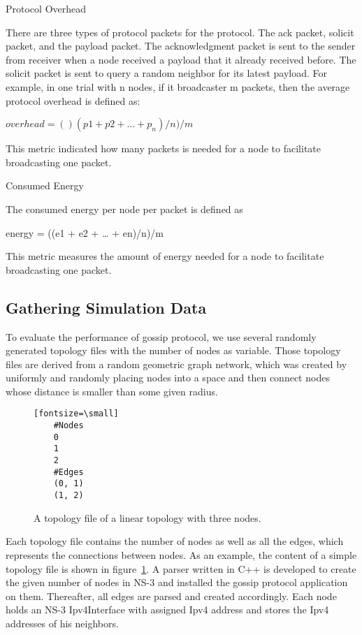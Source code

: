 Protocol Overhead

There are three types of protocol packets for the protocol. The ack packet, solicit packet, and the payload packet. The acknowledgment packet is sent to the sender from receiver when a node received a payload that it already received before. The solicit packet is sent to query a random neighbor for its latest payload. For example, in one trial with n nodes, if it broadcaster m packets, then the average protocol overhead is defined as:

$overhead = ()(p1 + p2 + … + p_n) / n) / m$

This metric indicated how many packets is needed for a node to facilitate broadcasting one packet. 

Consumed Energy

The consumed energy per node per packet is defined as

energy = ((e1 + e2 + … + en)/n)/m

This metric measures the amount of energy needed for a node to facilitate broadcasting one packet. 


\subsection{Gathering Simulation Data}

To evaluate the performance of gossip protocol, we use several randomly generated topology files with the number of nodes as variable. Those topology files are derived from a random geometric graph network, which was created by uniformly and randomly placing nodes into a space and then connect nodes whose distance is smaller than some given radius.

\begin{figure}
	\centering
	\begin{verbatim}[fontsize=\small]
	#Nodes
	0
	1
	2
	#Edges
	(0, 1)
	(1, 2)
	\end{verbatim}
	\caption{A topology file of a linear topology with three nodes.}
	\label{fig:topsimple}
\end{figure}


Each topology file contains the number of nodes as well as all the edges, which represents the connections between nodes. As an example, the content of a simple topology file is shown in figure~\ref{fig:topsimple}. A parser written in C++ is developed to create the given number of nodes in NS-3 and installed the gossip protocol application on them. Thereafter, all edges are parsed and created accordingly. Each node holds an NS-3 Ipv4Interface with assigned Ipv4 address and stores the Ipv4 addresses of his neighbors.

